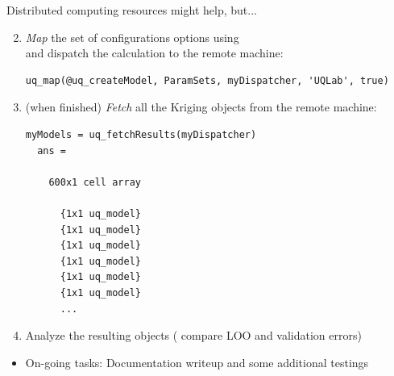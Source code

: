 \documentclass[]{rsuqbeamernew}
\begin{document}
  \begin{frame}[fragile]{Distributed computing resources might help, but...}
  
  \begin{enumerate}
    \setcounter{enumi}{1}
    \item \emph{Map} the set of configurations options using \\
           and dispatch the calculation to the remote machine:
  \begin{lstlisting}[basicstyle=\scriptsize]
  uq_map(@uq_createModel, ParamSets, myDispatcher, 'UQLab', true)
  \end{lstlisting}
    \item (when finished) \emph{Fetch} all the Kriging objects from the remote machine:
  \begin{lstlisting}[basicstyle=\scriptsize]
  myModels = uq_fetchResults(myDispatcher)
  ans =
  
    600x1 cell array
  
      {1x1 uq_model}
      {1x1 uq_model}
      {1x1 uq_model}
      {1x1 uq_model}
      {1x1 uq_model}
      {1x1 uq_model}
      ...
  \end{lstlisting}
    \item Analyze the resulting objects (\eg{,} compare LOO and validation errors)
  \end{enumerate}
  
  \begin{itemize}
    \item On-going tasks: Documentation writeup and some additional testings
  \end{itemize}
  
  \end{frame}
  
\end{document}
